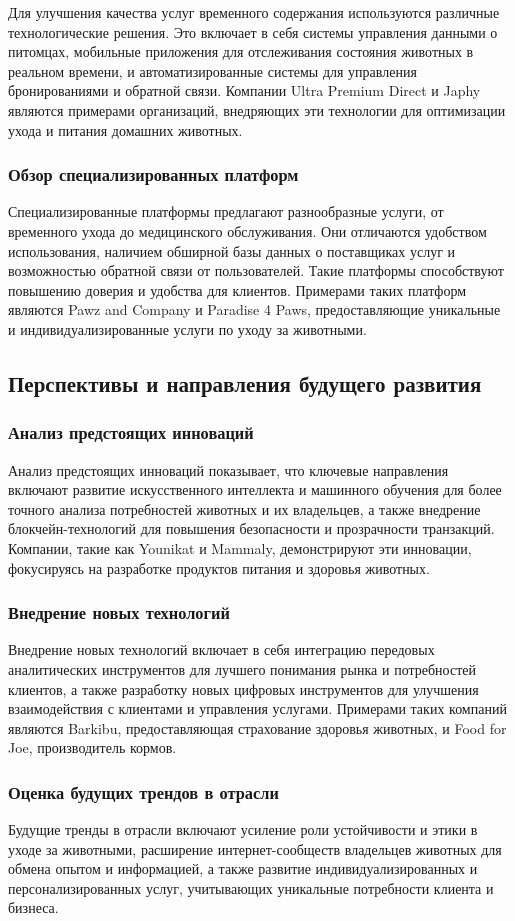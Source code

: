 Для улучшения качества услуг временного содержания используются различные технологические решения. Это включает в себя системы управления данными о питомцах, мобильные приложения для отслеживания состояния животных в реальном времени, и автоматизированные системы для управления бронированиями и обратной связи. Компании Ultra Premium Direct и Japhy являются примерами организаций, внедряющих эти технологии для оптимизации ухода и питания домашних животных.
\subsubsection{Обзор специализированных платформ}

Специализированные платформы предлагают разнообразные услуги, от временного ухода до медицинского обслуживания. Они отличаются удобством использования, наличием обширной базы данных о поставщиках услуг и возможностью обратной связи от пользователей. Такие платформы способствуют повышению доверия и удобства для клиентов. Примерами таких платформ являются Pawz and Company и Paradise 4 Paws, предоставляющие уникальные и индивидуализированные услуги по уходу за животными.
\subsection{Перспективы и направления будущего развития}
\subsubsection{Анализ предстоящих инноваций}

Анализ предстоящих инноваций показывает, что ключевые направления включают развитие искусственного интеллекта и машинного обучения для более точного анализа потребностей животных и их владельцев, а также внедрение блокчейн-технологий для повышения безопасности и прозрачности транзакций. Компании, такие как Younikat и Mammaly, демонстрируют эти инновации, фокусируясь на разработке продуктов питания и здоровья животных.
\subsubsection{Внедрение новых технологий}

Внедрение новых технологий включает в себя интеграцию передовых аналитических инструментов для лучшего понимания рынка и потребностей клиентов, а также разработку новых цифровых инструментов для улучшения взаимодействия с клиентами и управления услугами. Примерами таких компаний являются Barkibu, предоставляющая страхование здоровья животных, и Food for Joe, производитель кормов.
\subsubsection{Оценка будущих трендов в отрасли}

Будущие тренды в отрасли включают усиление роли устойчивости и этики в уходе за животными, расширение интернет-сообществ владельцев животных для обмена опытом и информацией, а также развитие индивидуализированных и персонализированных услуг, учитывающих уникальные потребности клиента и бизнеса.